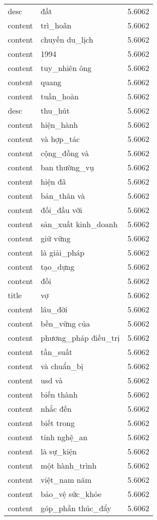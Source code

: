 \documentclass{article}
\begin{document}
\begin{tabular}{lll}
desc & đất & 5.6062\\
content & trì\_hoãn & 5.6062\\
content & chuyến du\_lịch & 5.6062\\
content & 1994 & 5.6062\\
content & tuy\_nhiên ông & 5.6062\\
content & quang & 5.6062\\
content & tuần\_hoàn & 5.6062\\
desc & thu\_hút & 5.6062\\
content & hiện\_hành & 5.6062\\
content & và hợp\_tác & 5.6062\\
content & cộng\_đồng và & 5.6062\\
content & ban thường\_vụ & 5.6062\\
content & hiện đã & 5.6062\\
content & bản\_thân và & 5.6062\\
content & đối\_đầu với & 5.6062\\
content & sản\_xuất kinh\_doanh & 5.6062\\
content & giữ vững & 5.6062\\
content & là giải\_pháp & 5.6062\\
content & tạo\_dựng & 5.6062\\
content & đồi & 5.6062\\
title & vợ & 5.6062\\
content & lâu\_đời & 5.6062\\
content & bền\_vững của & 5.6062\\
content & phương\_pháp điều\_trị & 5.6062\\
content & tần\_suất & 5.6062\\
content & và chuẩn\_bị & 5.6062\\
content & usd và & 5.6062\\
content & biến thành & 5.6062\\
content & nhắc đến & 5.6062\\
content & biết trong & 5.6062\\
content & tỉnh nghệ\_an & 5.6062\\
content & là sự\_kiện & 5.6062\\
content & một hành\_trình & 5.6062\\
content & việt\_nam năm & 5.6062\\
content & bảo\_vệ sức\_khỏe & 5.6062\\
content & góp\_phần thúc\_đẩy & 5.6062\\

\end{tabular}
\end{document}
